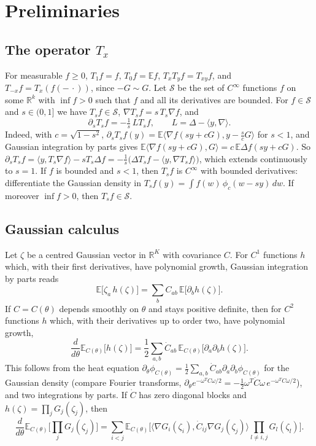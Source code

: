 \documentclass[11pt]{amsart}
\theoremstyle{definition}
\newcommand{\E}{\mathbb{E}}
\newcommand{\R}{\mathbb{R}}
\newcommand{\cS}{\mathcal{S}}
\begin{document}
\section{Preliminaries}
\subsection{The operator \texorpdfstring{$T_x$}{Tx}}
For measurable $f\ge0$, $T_1f=f$, $T_0f=\E f$, $T_xT_yf=T_{xy}f$, and $T_{-x}f=T_x(f(-\,\cdot))$, since $-G\sim G$.
Let $\cS$ be the set of $C^\infty$ functions $f$ on some $\R^k$ with $\inf f>0$ such that $f$ and all its derivatives are
bounded. For $f\in\cS$ and $s\in(0,1]$ we have $T_sf\in\cS$, $\nabla T_sf=s\,T_s\nabla f$, and
\begin{equation}\label{eq:dsT}
\partial_sT_sf=-\tfrac1s\,LT_sf,\qquad L=\Delta-\langle y,\nabla\rangle .
\end{equation}
Indeed, with $c=\sqrt{1-s^2}$, $\partial_sT_sf(y)=\E\langle\nabla f(sy+cG),y-\tfrac scG\rangle$ for $s<1$, and Gaussian
integration by parts gives $\E\langle\nabla f(sy+cG),G\rangle=c\,\E\Delta f(sy+cG)$. So
$\partial_sT_sf=\langle y,T_s\nabla f\rangle-sT_s\Delta f=-\frac1s\big(\Delta T_sf-\langle y,\nabla T_sf\rangle\big)$,
which extends continuously to $s=1$. If $f$ is bounded and $s<1$, then $T_sf$ is $C^\infty$ with bounded
derivatives: differentiate the Gaussian density in $T_sf(y)=\int f(w)\,\phi_{c}(w-sy)\,dw$. If moreover $\inf f>0$,
then $T_sf\in\cS$.

\subsection{Gaussian calculus}
Let $\zeta$ be a centred Gaussian vector in $\R^K$ with covariance $C$. For $C^1$ functions $h$ which, with their
first derivatives, have polynomial growth, Gaussian integration by parts reads
\begin{equation}\label{eq:ibp}
\E\big[\zeta_a\,h(\zeta)\big]=\sum_bC_{ab}\,\E\big[\partial_bh(\zeta)\big].
\end{equation}
If $C=C(\theta)$ depends smoothly on $\theta$ and stays positive definite, then for $C^2$ functions $h$ which, with
their derivatives up to order two, have polynomial growth,
\begin{equation}\label{eq:interp}
\frac{d}{d\theta}\E_{C(\theta)}\big[h(\zeta)\big]=\frac12\sum_{a,b}\dot C_{ab}\,\E_{C(\theta)}\big[\partial_a\partial_bh(\zeta)\big].
\end{equation}
This follows from the heat equation $\partial_\theta\phi_{C(\theta)}=\frac12\sum_{a,b}\dot C_{ab}\partial_a\partial_b\phi_{C(\theta)}$ for
the Gaussian density (compare Fourier transforms, $\partial_\theta e^{-\omega^TC\omega/2}=-\frac12\omega^T\dot C\omega
\,e^{-\omega^TC\omega/2}$), and two integrations by parts. If $\dot C$ has zero diagonal blocks and
$h(\zeta)=\prod_jG_j(\zeta_j)$, then
\begin{equation}\label{eq:drho}
\frac{d}{d\theta}\E_{C(\theta)}\Big[\prod_jG_j(\zeta_j)\Big]=\sum_{i<j}\E_{C(\theta)}\Big[\big\langle\nabla G_i(\zeta_i),
\dot C_{ij}\nabla G_j(\zeta_j)\big\rangle\prod_{l\ne i,j}G_l(\zeta_l)\Big].
\end{equation}
\end{document}
